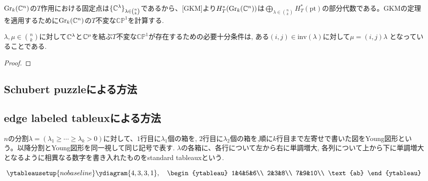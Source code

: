 $\text{Gr}_k(\mathbb{C}^n)$の$T$作用における固定点は$\{\mathbb{C}^\lambda\}_{\lambda\in\binom{n}{k}}$であるから、[GKM]より$H^*_T(\text{Gr}_k(\mathbb{C}^n))$は$\bigoplus_{\lambda\in\binom{n}{k}}H^*_T(\text{pt})$の部分代数である。GKMの定理を適用するために$\text{Gr}_k(\mathbb{C}^n)$の$T$不変な$\mathbb{CP}^1$を計算する.

\begin{prop}
  $\lambda,\mu\in\binom{n}{k}$に対して$\mathbb{C}^\lambda$と$\mathbb{C}^\mu$を結ぶ$T$不変な$\mathbb{CP}^1$が存在するための必要十分条件は, ある$(i, j)\in\text{inv}(\lambda)$に対して$\mu = (i, j)\lambda$
  となっていることである.
\end{prop}

\begin{proof}
  
\end{proof}




\subsection{Schubert puzzleによる方法}


\subsection{edge labeled tableuxによる方法}

\begin{defin}
  $n$の分割$\lambda=(\lambda_1\geq\cdots\geq\lambda_k>0)$に対して、$1$行目に$\lambda_1$個の箱を, $2$行目に$\lambda_2$個の箱を,順に$k$行目まで左寄せで書いた図をYoung図形という。以降分割とYoung図形を同一視して同じ記号で表す. $\lambda$の各箱に、各行について左から右に単調増大, 各列について上から下に単調増大となるように相異なる数字を書き入れたものをstandard tableauxという. 

\[
\ytableausetup{nobaseline}
\ydiagram{4, 3, 3, 1},
\quad\begin{ytableau}
    1&4&5&6\\
    2&3&8\\
    7&9&10\\
    \text{ab}
\end{ytableau}
\]

\end{defin}

